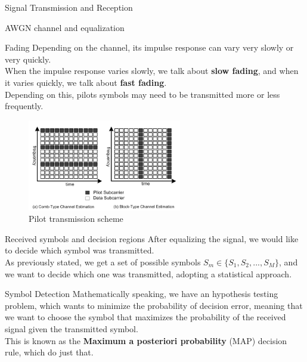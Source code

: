 \begin{section}{Signal Transmission and Reception}
\begin{subsection}{AWGN channel and equalization}
    \begin{subsubsection}{Fading}
      Depending on the channel, its impulse response can vary very slowly or very quickly.\\
      When the impulse response varies slowly, we talk about \textbf{slow fading}, and when it
      varies quickly, we talk about \textbf{fast fading}.\\
      Depending on this, pilots symbols may need to be transmitted more or less frequently.\\
      \begin{figure}[h]
        \centering
        \includegraphics[width=0.6\textwidth]{img/wireless/pilot transmission scheme.png}
        \caption{Pilot transmission scheme}
        \label{fig:pilot transmission}
      \end{figure}
    \end{subsubsection}
  \end{subsection}
  \begin{subsection}{Received symbols and decision regions}
    After equalizing the signal, we would like to decide which symbol was transmitted.\\
    As previously stated, we get a set of possible symbols $S_m\in\{S_1,S_2,...,S_M\}$, and we
    want to decide which one was transmitted, adopting a statistical approach.\\
    \begin{subsubsection}{Symbol Detection}
      Mathematically speaking, we have an hypothesis testing problem, which wants to minimize the
      probability of decision error, meaning that we want to choose the symbol that maximizes the
      probability of the received signal given the transmitted symbol.\\
      
      This is known as the \textbf{Maximum a posteriori probability} (MAP) decision rule, which
      do just that.
    \end{subsubsection}
  \end{subsection}
\end{section}
